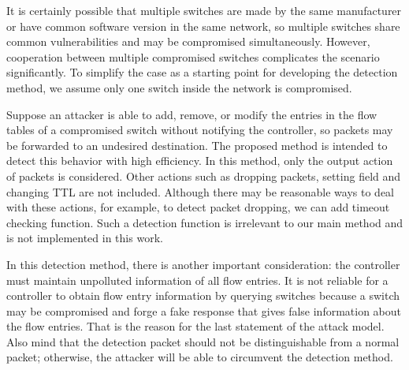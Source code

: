 It is certainly possible that multiple switches are made by the same manufacturer or have common software version in the same network, so multiple switches share common vulnerabilities and may be compromised simultaneously. However, cooperation between multiple compromised switches complicates the scenario significantly. To simplify the case as a starting point for developing the detection method, we assume only one switch inside the network is compromised.

Suppose an attacker is able to add, remove, or modify the entries in the flow tables of a compromised
switch without notifying the controller, so packets may be forwarded to an undesired destination. The proposed method is intended to detect this behavior with high efficiency. In this method, only the output action of packets is considered. Other actions such as dropping packets, setting field and changing TTL are not included. Although there may be reasonable ways to deal with these actions, for example, to detect packet dropping, we can add timeout checking function. Such a detection function is irrelevant to our main method and is not implemented in this work.

In this detection method, there is another important consideration: the controller must maintain unpolluted information of all flow entries. It is not reliable for a controller to obtain flow entry information by querying switches because a switch may be compromised and forge a fake response that gives false information about the flow entries. That is the reason for the last statement of the attack model. Also mind that the detection packet should not be distinguishable from a normal packet; otherwise, the attacker will be able to circumvent the detection method.